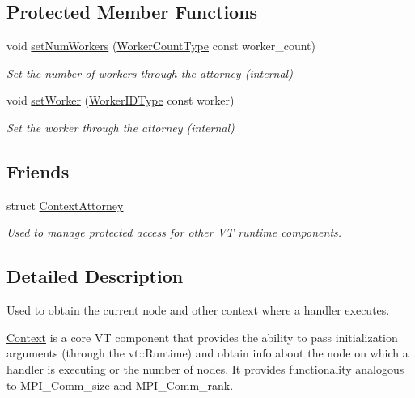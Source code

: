 \subsection*{Protected Member Functions}
\begin{DoxyCompactItemize}
\item 
void \hyperlink{structvt_1_1ctx_1_1_context_afc4549ac9cdae67301613613b9381d1c}{set\+Num\+Workers} (\hyperlink{namespacevt_aa93398ea48f2cb6c188512250f7cc248}{Worker\+Count\+Type} const worker\+\_\+count)
\begin{DoxyCompactList}\small\item\em Set the number of workers through the attorney (internal) \end{DoxyCompactList}\item 
void \hyperlink{structvt_1_1ctx_1_1_context_a32f62f26b7a6977c91186f8c2aa2b16a}{set\+Worker} (\hyperlink{namespacevt_a656e362091da17b9b93d0655b36e3392}{Worker\+I\+D\+Type} const worker)
\begin{DoxyCompactList}\small\item\em Set the worker through the attorney (internal) \end{DoxyCompactList}\end{DoxyCompactItemize}
\subsection*{Friends}
\begin{DoxyCompactItemize}
\item 
struct \hyperlink{structvt_1_1ctx_1_1_context_a75c33a90ea59b21ab5375343af0f8e26}{Context\+Attorney}
\begin{DoxyCompactList}\small\item\em Used to manage protected access for other VT runtime components. \end{DoxyCompactList}\end{DoxyCompactItemize}


\subsection{Detailed Description}
Used to obtain the current node and other context where a handler executes. 

\hyperlink{structvt_1_1ctx_1_1_context}{Context} is a core VT component that provides the ability to pass initialization arguments (through the {\ttfamily vt\+::\+Runtime}) and obtain info about the node on which a handler is executing or the number of nodes. It provides functionality analogous to {\ttfamily M\+P\+I\+\_\+\+Comm\+\_\+size} and {\ttfamily M\+P\+I\+\_\+\+Comm\+\_\+rank}. 

